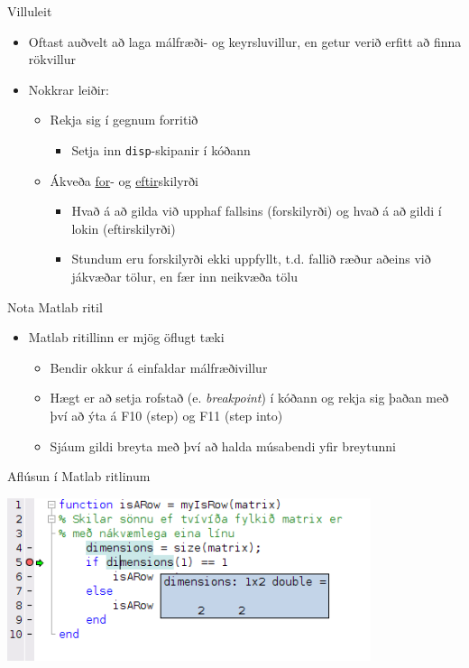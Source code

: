 \documentclass{beamer}
\begin{document}
\begin{frame}{Villuleit}
\begin{itemize}
 \item Oftast auðvelt að laga málfræði- og keyrsluvillur, en getur verið erfitt að finna rökvillur
 \item  Nokkrar leiðir:
 \begin{itemize}
  \item Rekja sig í gegnum forritið
  \begin{itemize}
   \item Setja inn \texttt{disp}-skipanir í kóðann
  \end{itemize}
 \end{itemize}
 \begin{itemize}
  \item Ákveða \underline{for}- og \underline{eftir}skilyrði
  \begin{itemize}
   \item Hvað á að gilda við upphaf fallsins (forskilyrði) og hvað á að gildi í lokin (eftirskilyrði)
   \item Stundum eru forskilyrði ekki uppfyllt, t.d. fallið ræður aðeins við jákvæðar tölur, en fær inn neikvæða tölu
  \end{itemize}
 \end{itemize}
\end{itemize}
\end{frame}

\begin{frame}{Nota Matlab ritil}
\begin{itemize}
 \item Matlab ritillinn er mjög öflugt tæki
 \begin{itemize}
  \item Bendir okkur á einfaldar málfræðivillur
  \item Hægt er að setja rofstað (e. \emph{breakpoint}) í kóðann og rekja sig þaðan með því að ýta á F10 (step) og F11 (step into)
  \item Sjáum gildi breyta með því að halda músabendi yfir breytunni
 \end{itemize}
\end{itemize}
\end{frame}

\begin{frame}{Aflúsun í Matlab ritlinum}
\begin{center}
\includegraphics[width=0.8\textwidth]{../Pics/debugging}
\end{center}
\end{frame}
\end{document}
